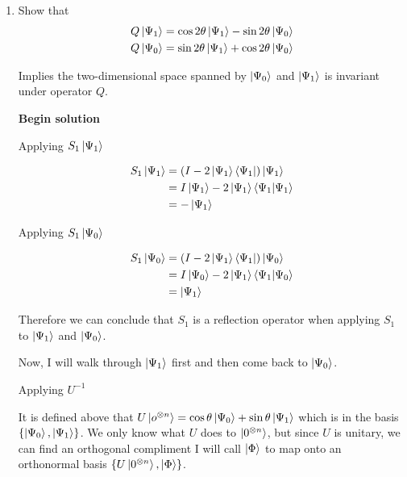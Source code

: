 \documentclass[11pt]{article}
\begin{document}
\begin{enumerate}
	      \begin{enumerate}
		      \item Show that
		            \begin{align*}
			            Q\ket{\Psi_1} & = \cos 2\theta\ket{\Psi_1} - \sin 2\theta\ket{\Psi_0} \\
			            Q\ket{\Psi_0} & = \sin 2\theta\ket{\Psi_1} + \cos 2\theta\ket{\Psi_0} \\
		            \end{align*}

		            Implies the two-dimensional space spanned by $\ket{\Psi_0}$ and $\ket{\Psi_1}$ is invariant under operator $Q$.

		            \textbf{Begin solution}

		            Applying $S_{1} \ket{\Psi_{1}}$

		            \begin{align*}
			            S_{1}\ket{\Psi_1} & = (I - 2\ket{\Psi_1}\bra{\Psi_1})\ket{\Psi_1}           \\
			                              & = I\ket{\Psi_1} - 2\ket{\Psi_1}\braket{\Psi_1 | \Psi_1} \\
			                              & = -\ket{\Psi_1}
		            \end{align*}

		            Applying $S_{1} \ket{\Psi_{0}}$

		            \begin{align*}
			            S_{1}\ket{\Psi_0} & = (I - 2\ket{\Psi_1}\bra{\Psi_1})\ket{\Psi_0}           \\
			                              & = I\ket{\Psi_0} - 2\ket{\Psi_1}\braket{\Psi_1 | \Psi_0} \\
			                              & = \ket{\Psi_1}
		            \end{align*}

		            Therefore we can conclude that $S_1$ is a reflection operator when applying $S_1$ to $\ket{\Psi_1}$ and $\ket{\Psi_0}$.

		            Now, I will walk through $\ket{\Psi_1}$ first and then come back to $\ket{\Psi_0}$.

		            Applying $U^{-1}$

		            It is defined above that $U \ket{o^{\otimes n}} = \cos\theta \ket{\Psi_0} + \sin\theta \ket{\Psi_1}$ which is in the basis $\{\ket{\Psi_{0}}, \ket{\Psi_{1}}\}$. We only know what $U$ does to $\ket{0^{\otimes n}}$, but since $U$ is unitary, we can find an orthogonal compliment I will call $\ket{\Phi}$ to map onto an orthonormal basis $\{U\ket{0^{\otimes n}}, \ket{\Phi}\}$.


\end{enumerate}
\end{enumerate}
\end{document}
